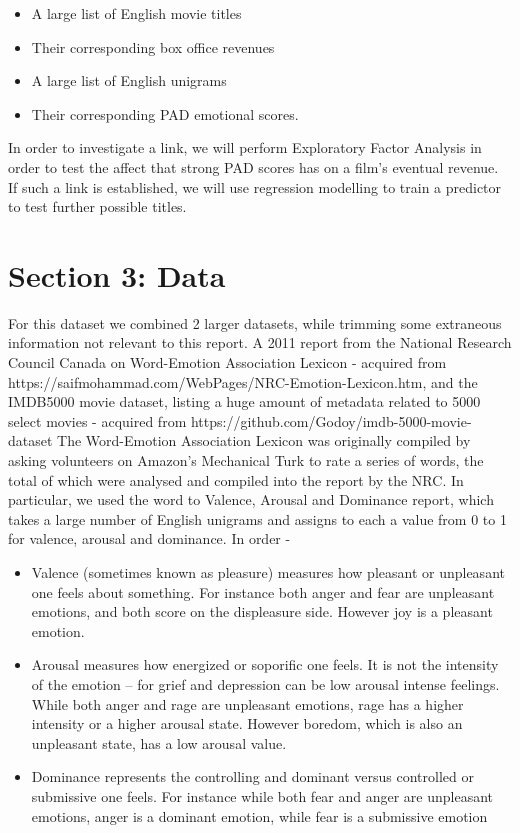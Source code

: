 \documentclass[10pt,a4paper]{article}
\begin{document}
    \n
    \begin{itemize}
    \item A large list of English movie titles
    \item Their corresponding box office revenues
    \item A large list of English unigrams
    \item Their corresponding PAD emotional scores.
    \end{itemize}
    
    \n

In order to investigate a link, we will perform Exploratory Factor Analysis in order to test the affect that strong PAD scores has on a film's eventual revenue. If such a link is established, we will use regression modelling to train a predictor to test further possible titles.

    \section{Section 3: Data}

    For this dataset we combined 2 larger datasets, while trimming some extraneous information not relevant to this report. A 2011 report from the National Research Council Canada on Word-Emotion Association Lexicon - acquired from https://saifmohammad.com/WebPages/NRC-Emotion-Lexicon.htm, and the IMDB5000 movie dataset, listing a huge amount of metadata related to 5000 select movies - acquired from https://github.com/Godoy/imdb-5000-movie-dataset
    \newline \newline
    The Word-Emotion Association Lexicon was originally compiled by asking volunteers on Amazon's Mechanical Turk to rate a series of words, the total of which were analysed and compiled into the report by the NRC. In particular, we used the word to Valence, Arousal and Dominance report, which takes a large number of English unigrams and assigns to each a value from 0 to 1 for valence, arousal and dominance. In order -

    \begin{itemize}
        \item Valence (sometimes known as pleasure) measures how pleasant or unpleasant one feels about something. For instance both anger and fear are unpleasant emotions, and both score on the displeasure side. However joy is a pleasant emotion.
        \item Arousal measures how energized or soporific one feels. It is not the intensity of the emotion -- for grief and depression can be low arousal intense feelings. While both anger and rage are unpleasant emotions, rage has a higher intensity or a higher arousal state. However boredom, which is also an unpleasant state, has a low arousal value.
        \item Dominance represents the controlling and dominant versus controlled or submissive one feels. For instance while both fear and anger are unpleasant emotions, anger is a dominant emotion, while fear is a submissive emotion
    \end{itemize}
\end{document}
